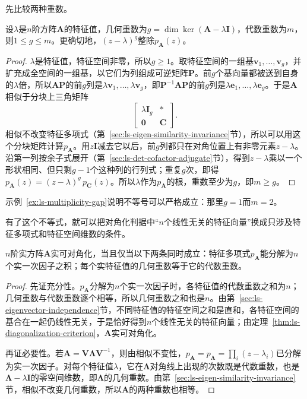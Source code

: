 先比较两种重数。
\begin{theorem}[几何重数不超过代数重数]
\label{thm:ls-geometric-algebraic-multiplicity}
设$\lambda$是$n$阶方阵$\bm A$的特征值，几何重数为$g=\dim\ker(\bm A-\lambda\bm I)$，代数重数为$m$，则$1\leq g\leq m$。更确切地，$(z-\lambda)^g$整除$p_{\bm A}(z)$。
\end{theorem}
\begin{proof}
$\lambda$是特征值，特征空间非零，所以$g\geq1$。取特征空间的一组基$\bm v_1,\ldots,\bm v_g$，并扩充成全空间的一组基，以它们为列组成可逆矩阵$\bm P$。前$g$个基向量都被送到自身的$\lambda$倍，所以$\bm A\bm P$的前$g$列是$\lambda\bm v_1,\ldots,\lambda\bm v_g$，即$\bm P^{-1}\bm A\bm P$的前$g$列是$\lambda\bm e_1,\ldots,\lambda\bm e_g$。于是$\bm A$相似于分块上三角矩阵
\[
 \begin{bmatrix}\lambda\bm I_g&*\\\bm0&\bm C\end{bmatrix}.
\]
相似不改变特征多项式（第~\ref{sec:ls-eigen-similarity-invariance}节），所以可以用这个分块矩阵计算$p_{\bm A}$。用$z\bm I$减去它以后，前$g$列都只在对角位置上有非零元素$z-\lambda$。沿第一列按余子式展开（第~\ref{sec:ls-det-cofactor-adjugate}节），得到$z-\lambda$乘以一个形状相同、但只剩$g-1$个这种列的行列式；重复$g$次，即得$p_{\bm A}(z)=(z-\lambda)^g\,p_{\bm C}(z)$。所以$\lambda$作为$p_{\bm A}$的根，重数至少为$g$，即$m\geq g$。
\end{proof}
示例~\ref{ex:ls-multiplicity-gap}说明不等号可以严格成立：那里$g=1$而$m=2$。

有了这个不等式，就可以把对角化判据中“$n$个线性无关的特征向量”换成只涉及特征多项式和特征空间维数的条件。
\begin{theorem}[重数判据]
\label{thm:ls-diagonalization-multiplicity}
$n$阶实方阵$\bm A$实可对角化，当且仅当以下两条同时成立：特征多项式$p_{\bm A}$能分解为$n$个实一次因子之积；每个实特征值的几何重数等于它的代数重数。
\end{theorem}
\begin{proof}
先证充分性。$p_{\bm A}$分解为$n$个实一次因子时，各特征值的代数重数之和为$n$；几何重数与代数重数逐个相等，所以几何重数之和也是$n$。由第~\ref{sec:ls-eigenvector-independence}节，不同特征值的特征空间之和是直和，各特征空间的基合在一起仍线性无关，于是恰好得到$n$个线性无关的特征向量；由定理~\ref{thm:ls-diagonalization-criterion}，$\bm A$实可对角化。

再证必要性。若$\bm A=\bm V\bm\Lambda\bm V^{-1}$，则由相似不变性，$p_{\bm A}=p_{\bm\Lambda}=\prod_i(z-\lambda_i)$已分解为实一次因子。对每个特征值$\lambda$，它在$\bm\Lambda$对角线上出现的次数既是代数重数，也是$\bm\Lambda-\lambda\bm I$的零空间维数，即$\bm\Lambda$的几何重数。由第~\ref{sec:ls-eigen-similarity-invariance}节，相似不改变几何重数，所以$\bm A$的两种重数也相等。
\end{proof}

